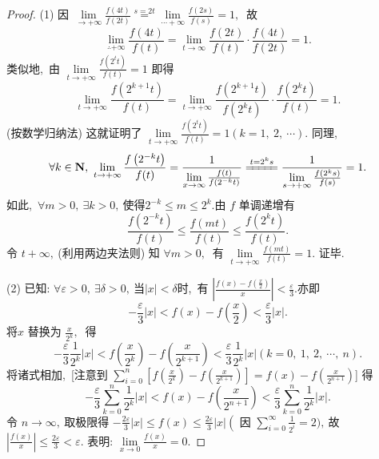 \begin{proof}
	(1) 因 $\lim\limits_{\rightarrow+\infty} \frac{f(4 t)}{f(2 t)} \stackrel{s=2 t}{=} \lim\limits_{\cdots+\infty} \frac{f(2 s)}{f(s)}=1 ,\ $ 故
	$$\lim\limits_{\therefore+\infty} \frac{f(4 t)}{f(t)}=\lim\limits_{t \rightarrow \infty} \frac{f(2 t)}{f(t)} \cdot \frac{f(4 t)}{f(2 t)}=1 .$$
	类似地,\ 由 $ \lim\limits_{t\rightarrow+\infty} \frac{f\left(2^{t} t\right)}{f(t)}=1 $ 即得  $$\lim\limits_{t\rightarrow+\infty} \frac{f\left(2^{k+1} t\right)}{f(t)}=\lim\limits_{t \rightarrow +\infty} \frac{f\left(2^{k+1} t\right)}{f\left(2^{k} t\right)} \cdot \frac{f\left(2^{k} t\right)}{f(t)}=1 .$$
	(按数学归纳法) 这就证明了 $ \lim\limits_{t \rightarrow +\infty} \frac{f\left(2^{t} t\right)}{f(t)}=1(k=1,\ 2,\  \cdots) .$
	同理,\   
	$$\forall k \in \mathbf{N},\  \lim\limits_{t\rightarrow+\infty} \frac{f\left(2^{-k} t\right)}{f(t)}=\frac{1}{\lim\limits_{x \rightarrow \infty} \frac{f(t)}{f\left(2^{-k} t\right)}} \xlongequal{t=2^{k} s}\frac{1}{\lim\limits\limits_{s \rightarrow +\infty} \frac{f\left(2^{k} s\right)}{f(s)}}=1 .$$
	如此,\ $  \forall m>0,\  \exists k>0 ,\  $使得$  2^{-k} \leqslant m \leqslant 2^{k} . $由 $ f$  单调递增有
	$$\frac{f(2^{-k}t)}{f(t)}\leqslant\frac{f(mt)}{f(t)}\leqslant\frac{f(2^kt)}{f(t)}.$$
	令 $ t+\infty ,\  $(利用两边夹法则) 知 $ \forall m>0 ,\ $ 有 $ \lim\limits_{t \rightarrow +\infty} \frac{f(m t)}{f(t)}=1 .$ 证毕.
	
	(2) 已知:  $\forall \varepsilon>0,\  \exists \delta>0 ,\  $当$  |x|<\delta  $时,\  有  $\left|\frac{f(x)-f\left(\frac{x}{2}\right)}{x}\right|<\frac{\varepsilon}{3} . $亦即
	$$-\frac{\varepsilon}{3}|x|<f(x)-f\left(\frac{x}{2}\right)<\frac{\varepsilon}{3}|x| .$$
	将$  x $ 替换为 $ \frac{x}{2^{k}} ,\ $ 得
	$$-\frac{\varepsilon}{3} \frac{1}{2^{k}}|x|<f\left(\frac{x}{2^{k}}\right)-f\left(\frac{x}{2^{k+1}}\right)<\frac{\varepsilon}{3} \frac{1}{2^{k}}|x|(k=0,\ 1,\ 2,\  \cdots,\  n) .$$
	将诸式相加,\ [注意到 $\sum\limits_{i=0}^{n}\left[f\left(\frac{x}{2^{k}}\right)-f\left(\frac{x}{2^{k+1}}\right)\right]=f(x)-f\left(\frac{x}{2^{n+1}}\right)  $] 得
	$$-\frac{\varepsilon}{3} \sum_{k=0}^{n} \frac{1}{2^{k}}|x|<f(x)-f\left(\frac{x}{2^{n+1}}\right)<\frac{\varepsilon}{3} \sum_{k=0}^{n} \frac{1}{2^{k}}|x| .$$
	令 $ n \rightarrow \infty ,\  $取极限得 $ -\frac{2 \varepsilon}{3}|x| \leqslant f(x) \leqslant \frac{2 \varepsilon}{3}|x|\left(\right. $ 因 $ \sum\limits_{i=0}^{\infty} \frac{1}{2^{i}}=2  ),\  $故  $\left|\frac{f(x)}{x}\right| \leqslant \frac{2 \varepsilon}{3}<\varepsilon .$
	表明: $ \lim\limits_{x \rightarrow 0} \frac{f(x)}{x}=0 .$
\end{proof}
